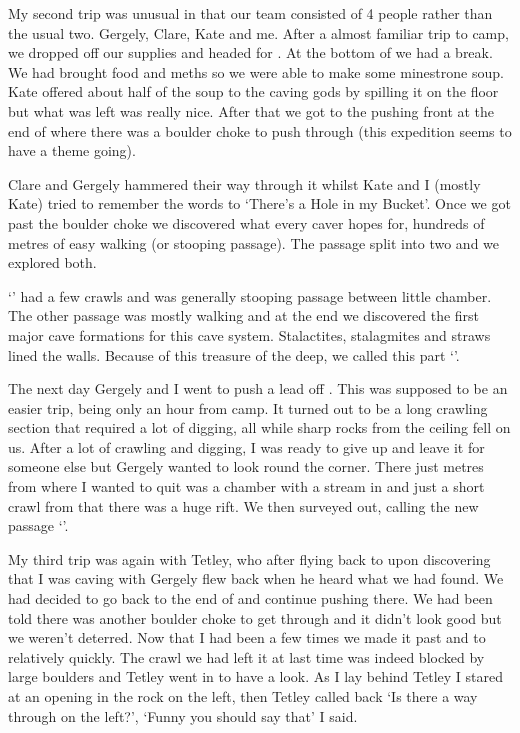 My second trip was unusual in that our team consisted of 4 people rather than the usual two. Gergely, Clare, Kate and me. After a almost familiar trip to camp, we dropped off our supplies and headed for . At the bottom of  we had a break. We had brought food and meths so we were able to make some minestrone soup. Kate offered about half of the soup to the caving gods by spilling it on the floor but what was left was really nice. After that we got to the pushing front at the end of  where there was a boulder choke to push through (this expedition seems to have a theme going). 


Clare and Gergely hammered their way through it whilst Kate and I (mostly Kate) tried to remember the words to ‘There’s a Hole in my Bucket’. Once we got past the boulder choke we discovered what every caver hopes for, hundreds of metres of easy walking (or stooping passage). The passage split into two and we explored both.

‘’ had a few crawls and was generally stooping passage between little chamber. The other passage was mostly walking and at the end we discovered the first major cave formations for this cave system. Stalactites, stalagmites and straws lined the walls. Because of this treasure of the deep, we called this part ‘’.

The next day Gergely and I went to push a lead off . This was supposed to be an easier trip, being only an hour from camp. It turned out to be a long crawling section that required a lot of digging, all while sharp rocks from the ceiling fell on us. After a lot of crawling and digging, I was ready to give up and leave it for someone else but Gergely wanted to look round the corner. There just metres from where I wanted to quit was a chamber with a stream in and just a short crawl from that there was a huge rift. We then surveyed out, calling the new passage ‘’.

My third trip was again with Tetley, who after flying back to  upon discovering that I was caving with Gergely flew back when he heard what we had found. We had decided to go back to the end of  and continue pushing there. We had been told there was another boulder choke to get through and it didn’t look good but we weren’t deterred. Now that I had been a few times we made it past  and to  relatively quickly. The crawl we had left it at last time was indeed blocked by large boulders and Tetley went in to have a look. As I lay behind Tetley I stared at an opening in the rock on the left, then Tetley called back ‘Is there a way through on the left?’, ‘Funny you should say that’ I said.

